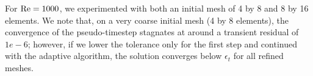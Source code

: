 For $\Reyn = 1000$, we experimented with both an initial mesh of 4 by 8 and 8 by 16 elements. We note that, on a very coarse initial mesh (4 by 8 elements), the convergence of the pseudo-timestep stagnates at around a transient residual of $1e-6$; however, if we lower the tolerance only for the first step and continued with the adaptive algorithm, the solution converges below $\epsilon_t$ for all refined meshes. 
\begin{figure}[!h]
\centering
{}

\end{figure}
